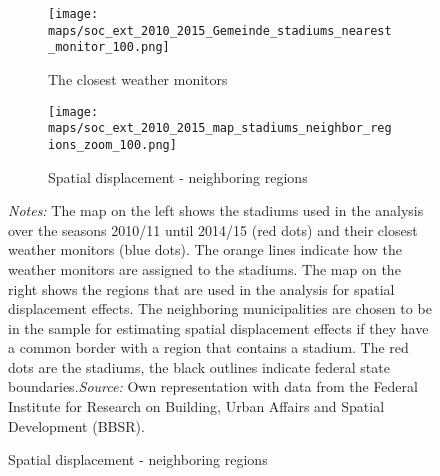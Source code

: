 \documentclass[11pt, a4paper]{article} %
\begin{document}
\begin{landscape}
	\vspace*{\fill}
	\begin{figure}[H]\centering
		\caption{The stadiums and the closest weather monitors and neighboring regions}\label{fig_soc_ext:map_gem_stadiums_monitor_and_neighboring_regions}

		\begin{subfigure}[h]{0.47\linewidth}\centering\caption{The closest weather monitors}
			\texttt{[image: maps/soc\_ext\_2010\_2015\_Gemeinde\_stadiums\_nearest\_monitor\_100.png]}
		\end{subfigure}
		\begin{subfigure}[h]{0.47\linewidth}\centering\caption{Spatial displacement - neighboring regions}
			\texttt{[image: maps/soc\_ext\_2010\_2015\_map\_stadiums\_neighbor\_regions\_zoom\_100.png]}
		\end{subfigure}
		\scriptsize
		\begin{minipage}{0.95\linewidth}
			\scriptsize{\emph{Notes:} The map on the left shows the stadiums used in the analysis over the seasons 2010/11 until 2014/15 (red dots) and their closest weather monitors (blue dots). The orange lines indicate how the weather monitors are assigned to the stadiums. The map on the right shows the regions that are used in the analysis for spatial displacement effects. The neighboring municipalities are chosen to be in the sample for estimating spatial displacement effects if they have a common border with a region that contains a stadium. The red dots are the stadiums, the black outlines indicate federal state boundaries.\newline \emph{Source:} Own representation with data from the Federal Institute for Research on Building, Urban Affairs and Spatial Development (BBSR).}
		\end{minipage}
	\end{figure}
	\vspace*{\fill}\clearpage
\end{landscape}
\restoregeometry




\end{document}
